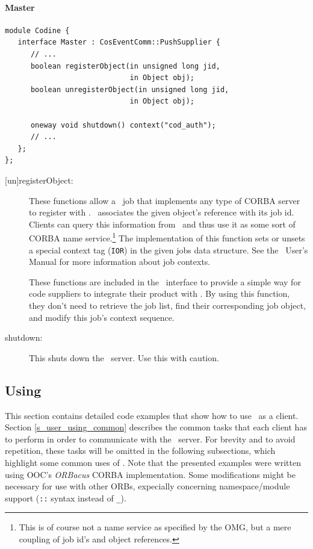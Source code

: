 \paragraph{Master}
\begin{Verbatim}[fontsize=\small, frame=single]
module Codine {
   interface Master : CosEventComm::PushSupplier {
      // ...
      boolean registerObject(in unsigned long jid,
                             in Object obj);
      boolean unregisterObject(in unsigned long jid, 
                             in Object obj);

      oneway void shutdown() context("cod_auth");
      // ...
   };
};
\end{Verbatim}
\begin{description}
\item[{[un]}registerObject:] These functions allow a \codine\ job that
implements any type of CORBA server to register with \qidl. \codine\ 
associates the given object's reference with its job id. Clients can query
this information from \codine\ and thus use it as some sort of CORBA name
service.\footnote{This is of course not a name service as specified by
the OMG, but a mere coupling of job id's and object references.} 
The implementation of this
function sets or unsets a special context tag (\texttt{IOR}) in the given 
jobs data structure. See the \codine\ User's Manual for more information about
job contexts.

These functions are included in the \master\ interface to provide a simple way
for code suppliers to integrate their product with \codine. By using this
function, they don't need to retrieve the job list, find their corresponding
job object, and modify this job's context sequence.

\item[shutdown:] This shuts down the \qidl\ server. Use this with caution.
\end{description}

\subsection{\label{s_user_using_qidl}Using \qidl}
This section contains detailed code examples that show how to use \qidl\ as a
client. Section \ref{s_user_using_common} describes the common tasks that
each client has to perform in order to communicate with the \qidl\ server.
For brevity and to avoid repetition, these tasks will be omitted in the
following subsections, which highlight some common uses of \qidl. Note
that the presented examples were written using OOC's \textsl{ORBacus} CORBA
implementation. Some modifications might be necessary for use with other
ORBs, expecially concerning namespace/module support (\texttt{::} syntax
instead of \texttt{\_}).

